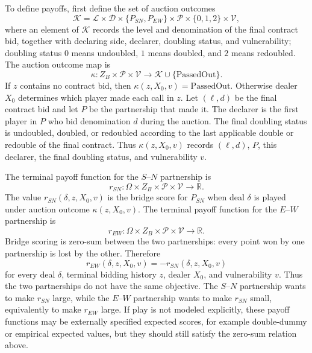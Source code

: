 \documentclass[11pt]{article}
\begin{document}
To define payoffs, first define the set of auction outcomes
\[
    \mathcal{K}=\mathcal{L}\times\mathcal{D}\times\{P_{SN},P_{EW}\}\times\mathcal{P}\times\{0,1,2\}\times\mathcal{V},
\]
where an element of $\mathcal{K}$ records the level and denomination of the final contract bid, together with declaring side, declarer, doubling status, and vulnerability; doubling status $0$ means undoubled, $1$ means doubled, and $2$ means redoubled. The auction outcome map is
\[
    \kappa:Z_B\times\mathcal{P}\times\mathcal{V}\to\mathcal{K}\cup\{\mathrm{PassedOut}\}.
\]
If $z$ contains no contract bid, then $\kappa(z,X_0,v)=\mathrm{PassedOut}$. Otherwise dealer $X_0$ determines which player made each call in $z$. Let $(\ell,d)$ be the final contract bid and let $P$ be the partnership that made it. The declarer is the first player in $P$ who bid denomination $d$ during the auction. The final doubling status is undoubled, doubled, or redoubled according to the last applicable double or redouble of the final contract. Thus $\kappa(z,X_0,v)$ records $(\ell,d)$, $P$, this declarer, the final doubling status, and vulnerability $v$.

The terminal payoff function for the $S$--$N$ partnership is
\[
    r_{SN}:\Omega\times Z_B\times\mathcal{P}\times\mathcal{V}\to\mathbb{R}.
\]
The value $r_{SN}(\delta,z,X_0,v)$ is the bridge score for $P_{SN}$ when deal $\delta$ is played under auction outcome $\kappa(z,X_0,v)$. The terminal payoff function for the $E$--$W$ partnership is
\[
    r_{EW}:\Omega\times Z_B\times\mathcal{P}\times\mathcal{V}\to\mathbb{R}.
\]
Bridge scoring is zero-sum between the two partnerships: every point won by one partnership is lost by the other. Therefore
\[
    r_{EW}(\delta,z,X_0,v)=-r_{SN}(\delta,z,X_0,v)
\]
for every deal $\delta$, terminal bidding history $z$, dealer $X_0$, and vulnerability $v$. Thus the two partnerships do not have the same objective. The $S$--$N$ partnership wants to make $r_{SN}$ large, while the $E$--$W$ partnership wants to make $r_{SN}$ small, equivalently to make $r_{EW}$ large. If play is not modeled explicitly, these payoff functions may be externally specified expected scores, for example double-dummy or empirical expected values, but they should still satisfy the zero-sum relation above.
\end{document}
